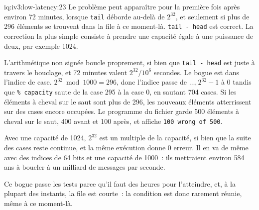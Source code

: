 \begin{solution}{iq:iv3:low-latency:23}
Le problème peut apparaître pour la première fois après environ 72 minutes, lorsque \texttt{tail} déborde au-delà de $2^{32}$, et seulement si plus de 296 éléments se trouvent dans la file à ce moment-là. \texttt{tail - head} est correct. La correction la plus simple consiste à prendre une capacité égale à une puissance de deux, par exemple 1024.

L'arithmétique non signée boucle proprement, si bien que \texttt{tail - head} est juste à travers le bouclage, et 72 minutes valent $2^{32} / 10^6$ secondes. Le bogue est dans l'indice de case. $2^{32} \bmod 1000 = 296$, donc l'indice passe de $\dots, 2^{32} - 1$ à 0 tandis que \texttt{\% capacity} saute de la case 295 à la case 0, en sautant 704 cases. Si les éléments à cheval sur le saut sont plus de 296, les nouveaux éléments atterrissent sur des cases encore occupées. Le programme du fichier garde 500 éléments à cheval sur le saut, 400 avant et 100 après, et affiche \texttt{100 wrong of 500}.

Avec une capacité de 1024, $2^{32}$ est un multiple de la capacité, si bien que la suite des cases reste continue, et la même exécution donne 0 erreur. Il en va de même avec des indices de 64 bits et une capacité de 1000~: ils mettraient environ 584 ans à boucler à un milliard de messages par seconde.

Ce bogue passe les tests parce qu'il faut des heures pour l'atteindre, et, à la plupart des instants, la file est courte~: la condition est donc rarement réunie, même à ce moment-là.

\end{solution}


